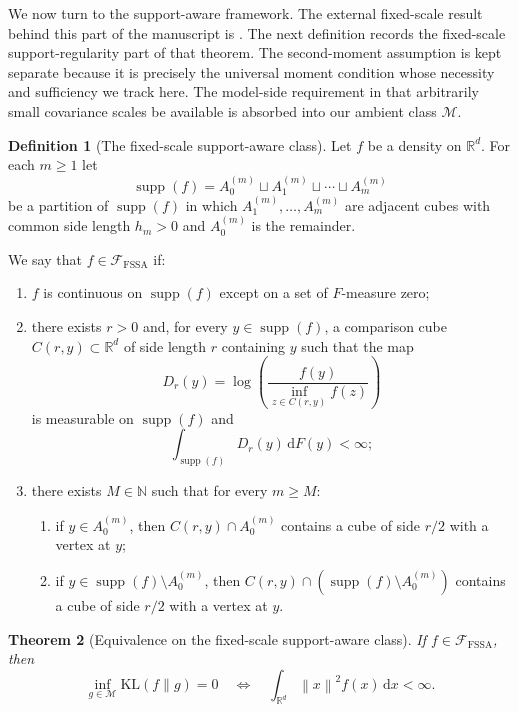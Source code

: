 \documentclass[11pt]{article}
\newtheorem{theorem}{Theorem}[section]
\theoremstyle{definition}
\newtheorem{definition}[theorem]{Definition}
\begin{document}
We now turn to the support-aware framework. The external fixed-scale result behind this part of the manuscript is \citet[Theorem~3]{NoretsPelenis2012}. The next definition records the fixed-scale support-regularity part of that theorem. The second-moment assumption is kept separate because it is precisely the universal moment condition whose necessity and sufficiency we track here. The model-side requirement in \citet{NoretsPelenis2012} that arbitrarily small covariance scales be available is absorbed into our ambient class $\mathcal M$.

\begin{definition}[The fixed-scale support-aware class]
\label{def:Sfix}
Let $f$ be a density on $\mathbb{R}^d$. For each $m\ge1$ let
\[
\operatorname{supp}(f)=A^{(m)}_0\sqcup A^{(m)}_1\sqcup\cdots\sqcup A^{(m)}_{m}
\]
be a partition of $\operatorname{supp}(f)$ in which $A^{(m)}_1,\dots,A^{(m)}_{m}$ are adjacent cubes with common side length $h_m>0$ and $A^{(m)}_0$ is the remainder.

We say that $f\in\mathcal F_{\mathrm{FSSA}}$ if:
\begin{enumerate}[label=\textnormal{(\roman*)}]
    \item $f$ is continuous on $\operatorname{supp}(f)$ except on a set of $F$-measure zero;
    \item there exists $r>0$ and, for every $y\in \operatorname{supp}(f)$, a comparison cube $C(r,y)\subset \mathbb{R}^d$ of side length $r$ containing $y$ such that the map
    \[
    D_r(y)=\log\!\left(\frac{f(y)}{\inf_{z\in C(r,y)}f(z)}\right)
    \]
    is measurable on $\operatorname{supp}(f)$ and
    \[
    \int_{\operatorname{supp}(f)} D_r(y)\,\mathrm{d}F(y)<\infty;
    \]
    \item there exists $M\in\mathbb N$ such that for every $m\ge M$:
    \begin{enumerate}[label=\textnormal{(\alph*)}]
        \item if $y\in A^{(m)}_0$, then $C(r,y)\cap A^{(m)}_0$ contains a cube of side $r/2$ with a vertex at $y$;
        \item if $y\in \operatorname{supp}(f)\setminus A^{(m)}_0$, then $C(r,y)\cap \left(\operatorname{supp}(f)\setminus A^{(m)}_0\right)$ contains a cube of side $r/2$ with a vertex at $y$.
    \end{enumerate}
\end{enumerate}
\end{definition}

\begin{theorem}[Equivalence on the fixed-scale support-aware class]
\label{thm:Sfixiff}
If $f\in\mathcal F_{\mathrm{FSSA}}$, then
\[
\inf_{g\in\mathcal M}\mathrm{KL}(f\|g)=0
\quad\Longleftrightarrow\quad
\int_{\mathbb{R}^d}\left\lVert x \right\rVert^2f(x)\,\mathrm{d}x<\infty.
\]
\end{theorem}
\end{document}
